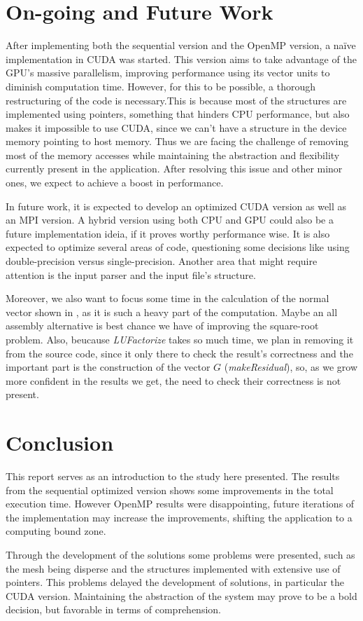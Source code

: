 \documentclass[a4paper,10pt,openright,openbib,twocolumn]{article}
\begin{document}
\section{On-going and Future Work}    %
\label{sec:futurework}
After implementing both the sequential version and the OpenMP version, a na\"{i}ve implementation in CUDA was started. This version aims to take advantage of the GPU's massive parallelism, improving performance using its vector units to diminish computation time. However, for this to be possible, a thorough restructuring of the code is necessary.This is because most of the structures are implemented using pointers, something that hinders CPU performance, but also makes it impossible to use CUDA, since we can't have a structure in the device memory pointing to host memory. Thus we are facing the challenge of removing most of the memory accesses while maintaining the abstraction and flexibility currently present in the application. After resolving this issue and other minor ones, we expect to achieve a boost in performance.

In future work, it is expected to develop an optimized CUDA version as well as an MPI version. A hybrid version using both CPU and GPU could also be a future implementation ideia, if it proves worthy performance wise. It is also expected to optimize several areas of code, questioning some decisions like using double-precision versus single-precision. Another area that might require attention is the input parser and the input file's structure. 

Moreover, we also want to focus some time in the calculation of the normal vector shown in , as it is such a heavy part of the computation. Maybe an all assembly alternative is best chance we have of improving the square-root problem. Also, beucause \emph{LUFactorize} takes so much time, we plan in removing it from the source code, since it only there to check the result's correctness and the important part is the construction of the vector $G$ (\emph{makeResidual}), so, as we grow more confident in the results we get, the need to check their correctness is not present.

\section{Conclusion}
\label{sec:conclusion}
This report serves as an introduction to the study here presented. The results from the sequential optimized version shows some improvements in the total execution time.
However OpenMP results were disappointing, future iterations of the implementation may increase the improvements, shifting the application to a computing bound zone.

Through the development of the solutions some problems were presented, such as the mesh being disperse and the structures implemented with extensive use of pointers. This problems delayed the development of solutions, in particular the CUDA version. Maintaining the abstraction of the system may prove to be a bold decision, but favorable in terms of comprehension.
\end{document}
